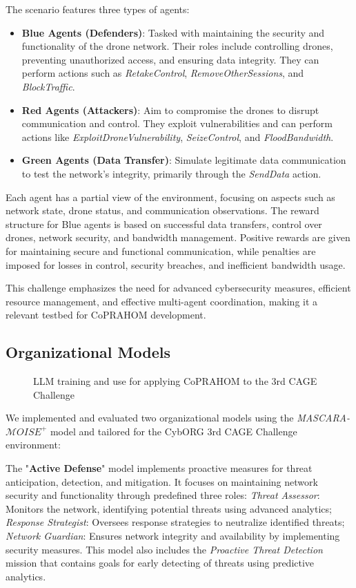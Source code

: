 \documentclass[conference]{IEEEtran}
\begin{document}
The scenario features three types of agents:
\begin{itemize}
    \item \textbf{Blue Agents (Defenders)}: Tasked with maintaining the security and functionality of the drone network. Their roles include controlling drones, preventing unauthorized access, and ensuring data integrity. They can perform actions such as \textit{RetakeControl}, \textit{RemoveOtherSessions}, and \textit{BlockTraffic}.
    \item \textbf{Red Agents (Attackers)}: Aim to compromise the drones to disrupt communication and control. They exploit vulnerabilities and can perform actions like \textit{ExploitDroneVulnerability}, \textit{SeizeControl}, and \textit{FloodBandwidth}.
    \item \textbf{Green Agents (Data Transfer)}: Simulate legitimate data communication to test the network's integrity, primarily through the \textit{SendData} action.
\end{itemize}

Each agent has a partial view of the environment, focusing on aspects such as network state, drone status, and communication observations. The reward structure for Blue agents is based on successful data transfers, control over drones, network security, and bandwidth management. Positive rewards are given for maintaining secure and functional communication, while penalties are imposed for losses in control, security breaches, and inefficient bandwidth usage.

This challenge emphasizes the need for advanced cybersecurity measures, efficient resource management, and effective multi-agent coordination, making it a relevant testbed for CoPRAHOM development.

\subsection{Organizational Models}

\begin{figure}[h!]
    \centering
    
    \caption{LLM training and use for applying CoPRAHOM to the 3rd CAGE Challenge}\label{fig:llm_process}
\end{figure}


We implemented and evaluated two organizational models using the \textit{MASCARA-$\mathcal{M}OISE^+$} model and tailored for the CybORG 3rd CAGE Challenge environment:

The "\textbf{Active Defense}" model implements proactive measures for threat anticipation, detection, and mitigation. It focuses on maintaining network security and functionality through predefined three roles:
%
\textit{Threat Assessor}: Monitors the network, identifying potential threats using advanced analytics;
\textit{Response Strategist}: Oversees response strategies to neutralize identified threats;
\textit{Network Guardian}: Ensures network integrity and availability by implementing security measures.
%
This model also includes the \textit{Proactive Threat Detection} mission that contains goals for early detecting of threats using predictive analytics.
\end{document}
